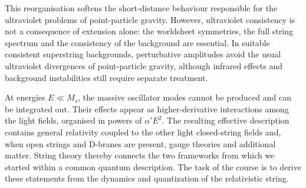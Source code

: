 This reorganisation softens the short-distance behaviour responsible for the ultraviolet problems of point-particle gravity. However, ultraviolet consistency is not a consequence of extension alone: the worldsheet symmetries, the full string spectrum and the consistency of the background are essential. In suitable consistent superstring backgrounds, perturbative amplitudes avoid the usual ultraviolet divergences of point-particle gravity, although infrared effects and background instabilities still require separate treatment.

At energies $E\ll M_s$, the massive oscillator modes cannot be produced and can be integrated out. Their effects appear as higher-derivative interactions among the light fields, organised in powers of $\alpha' E^2$. The resulting effective description contains general relativity coupled to the other light closed-string fields and, when open strings and D-branes are present, gauge theories and additional matter. String theory thereby connects the two frameworks from which we started within a common quantum description. The task of the course is to derive these statements from the dynamics and quantization of the relativistic string.
